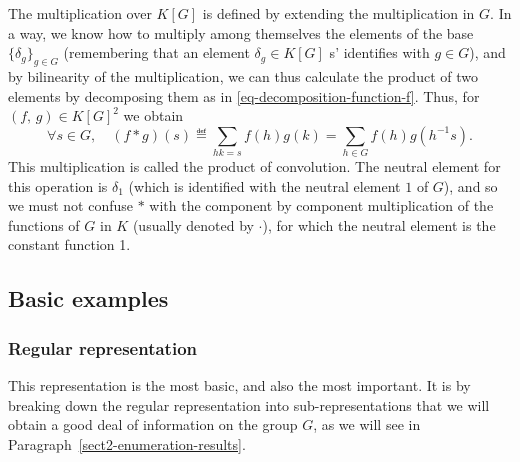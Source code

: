 \begin{defn}
 The multiplication over $ K[G] $ is defined by extending the multiplication in $G$. In a way, we know how to multiply among themselves the elements of the base $ \{\delta_g\}_{g \in G} $ (remembering that an element $ \delta_g \in K[G] $ s' identifies with $ g \in G $), and by bilinearity of the multiplication, we can thus calculate the product of two elements by decomposing them as in \eqref{eq-decomposition-function-f}. Thus, for $ (f, \, g) \in K[G]^2 $ we obtain
\begin{equation*}
\forall s \in G, \quad (f * g) (s) \eqdef \sum_{hk = s}{f(h) g (k)} = \sum_{h \in G}{f(h) g (h^{-1} s)}.
\end{equation*}
This multiplication is called the product of convolution. The neutral element for this operation is $ \delta_1 $ (which is identified with the neutral element $ 1 $ of $G$), and so we must not confuse $ * $ with the component by component multiplication of the functions of $G$ in $K$ (usually denoted by $ \cdot $), for which the neutral element is the constant function 1.
\end{defn}
 
\subsection{Basic examples}
 
\subsubsection{Regular representation}
\label{sect3-regular-representation}
 
 This representation is the most basic, and also the most important. It is by breaking down the regular representation into sub-representations that we will obtain a good deal of information on the group $G$, as we will see in Paragraph~\ref{sect2-enumeration-results}.
 
